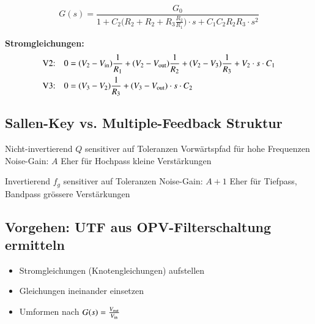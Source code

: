 $$ \boxed{ G(s) = \frac{G_0}{1 + C_2 \Big( R_2 + R_2 + R_3 \frac{R_2}{R_1} \Big) \cdot s + C_1 C_2 R_2 R_3 \cdot s^2 }}$$

\textbf{Stromgleichungen:}
\begin{align*}
    \text{V2:} \quad 0 &= (V_2 - V_{\rm in}) \frac{1}{R_1} + (V_2 - V_{\rm out}) \frac{1}{R_2} + (V_2 - V_3) \frac{1}{R_3} + V_2 \cdot s \cdot C_1  \\
    \text{V3:} \quad 0 &= (V_3 - V_2) \frac{1}{R_3} + (V_3 - V_{\rm out})  \cdot s \cdot C_2 
\end{align*}

\subsection{Sallen-Key vs. Multiple-Feedback Struktur}

\begin{minipage}[t]{0.48\columnwidth}
    \begin{center}
    \end{center}
    \begin{outline}
        \1 Nicht-invertierend
        \1 $Q$ sensitiver auf Toleranzen
        \1 Vorwärtspfad für hohe Frequenzen
        \1 Noise-Gain: $A$
        \1 Eher für 
            \2 Hochpass
            \2 kleine Verstärkungen
    \end{outline}
\end{minipage}
\hfill
\begin{minipage}[t]{0.48\columnwidth}
    \begin{center}
    \end{center}
    \begin{outline}
        \1 Invertierend
        \1 $f_g$ sensitiver auf Toleranzen 
        \1[] %
        \1 Noise-Gain: $A+1$
        \1 Eher für 
            \2 Tiefpass, Bandpass
            \2 grössere Verstärkungen
    \end{outline}
\end{minipage}


\subsection{Vorgehen: UTF aus OPV-Filterschaltung ermitteln}
\begin{itemize}
    \item Stromgleichungen (Knotengleichungen) aufstellen
    \item Gleichungen ineinander einsetzen
    \item Umformen nach $G(s) = \frac{V_{\rm out}}{V_{\rm in}}$
\end{itemize}


